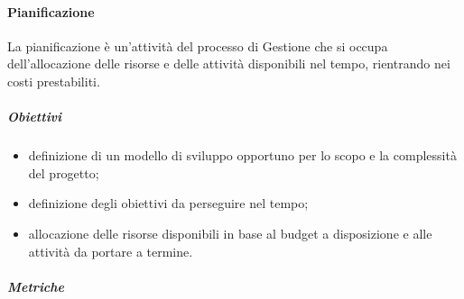 \paragraph{Pianificazione}
La pianificazione è un'attività del processo di Gestione che si occupa dell'allocazione delle risorse e delle attività disponibili nel tempo, rientrando nei costi prestabiliti.
\subparagraph{Obiettivi}
\begin{itemize}
	\item definizione di un modello di sviluppo opportuno per lo scopo e la complessità del progetto;
	\item definizione degli obiettivi da perseguire nel tempo;
	\item allocazione delle risorse disponibili in base al budget a disposizione e alle attività da portare a termine.
\end{itemize}
\subparagraph{Metriche}
